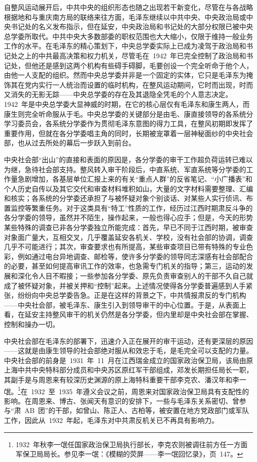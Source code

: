 自整风运动展开后，中共中央的组织形态也随之出现若干新变化，尽管在与各战略根据地和与重庆南方局的联络来往方面，毛泽东继续以中共中央、中央政治局或中央书记处的名义发布指示，但在延安，中央政治局和书记处的大部分权限已被中央总学委所取代。中共中央大多数部委的职权范围也大大缩小，仅限于维持一般业务工作的水平。在毛泽东的精心策划下，中央总学委实际上已成为凌驾于政治局和书记处之上的中共最高决策和权力机关，尽管毛在~1942~年已完全控制了政治局和书记处，但他还是感到这两个机构有些碍手碍脚，毛要创设一个完全听命于他个人，由他一人支配的组织。然而中央总学委并非是一个固定的实体，它只是毛泽东为掩饰其在党内实行一人统治而设置的临时机构，在整风运动期间，它时而出现，时而又消失的无影无踪——中央总学委的存在及其退隐全凭毛的个人意志决定。1942~年是中央总学委大显神威的时期，在它的核心层仅有毛泽东和康生两人，而康生则完全听命服从于毛。中央总学委的关键部分是由毛、康直接领导的各系统分学习委员会，各系统分学委作为贯彻毛泽东意图的得力工具，在整风初期即发挥了重要作用，但就在各分学委唱主角的同时，长期被宠罩着一层神秘面纱的中央社会部，也从过去所处的幕后一步跃入到前台。

中央社会部“出山”的直接和表面的原因是，各分学委的审干工作超负荷运转已难以为继，急待社会部支持。整风转入审干阶段后，中直系统、军直系统等分学委的工作量急剧增加，各基层单位汇报上来的有关“重点人群”的反省笔记、“小广播表”和个人历史自传以及其它交代和审查材料堆积如山，大量的文字材料需要整理、汇编和核实；各系统的分学委还承担了与被怀疑对象个别谈话、对某些人实行侦讯、布置监控等繁重任务。对于这类具有“特工”性质的工作，经历过江西时期肃反斗争的各分学委的领导，虽然并不陌生，操作起来，一般也得心应手；但是，今天的形势某些特殊的调查已非各分学委独立所能完成：首先，早已不同于江西时期，被审查对象面广量大，互相交叉，几乎覆盖延安各机关、学校，没有社会部的协调，调查几乎不可能进行；其次，审查要求也有所提高，某些审查项目已带有特殊的专业色彩，例如通过电台异地调查、邮检等，使许多分学委的领导同志深感有社会部配合的必要，甚至如何提高审讯工作的效率，也急需专门机关的指导；第三，运动的发展和深化令人目不暇接；一些参加各分学委、原先负责审查别人的干部不久自己就成了被怀疑对象，并被关押和“控制”起来。上述情况使得各分学委普遍感到人手紧张，纷纷向中央总学委告急。正是在这样的背景之下，中共情报肃反的专门机构——中央社会部，被毛泽东、康生引入到领导审干的中心位置。于是，从表面上看，在延安主持整风审干的机关仍然是各分学委，但内里却是中央社会部在掌握、控制和操办一切。

中央社会部在毛泽东的部署下，迅速介入正在展开的审干运动，还有更深层的原因——这就是由康生领导的社会部绝对服从和效忠于毛，是毛完全可以支配的力量。中央社会部的前身是~1931~年~11~月在江西瑞金成立的国家政治保卫局，该局由原上海中共中央特科部分成员和中央苏区原红军干部组成，邓发长期担任局长一职，其副手是与周恩来有较深历史渊源的原上海特科重要干部李克农、潘汉年和李一氓。\footnote{1932~年秋李一氓任国家政治保卫局执行部长，李克农则被调往前方任一方面军保卫局局长。参见李一氓：《模糊的荧屏——李一氓回忆录》，页~147。}在~1932~至~1935~年遵义会议之前，周恩来对国家政治保卫局具有支配性的影响。在周恩来、博古、张闻天有意识的安排下，一些与毛泽东关系密切、曾参与“肃~AB~团”的干部，如曾山、陈正人、古柏等，被安置在地方党政部门或军队工作，因此从~1932~年起，毛泽东对中共肃反机关已不再具有影响力。

